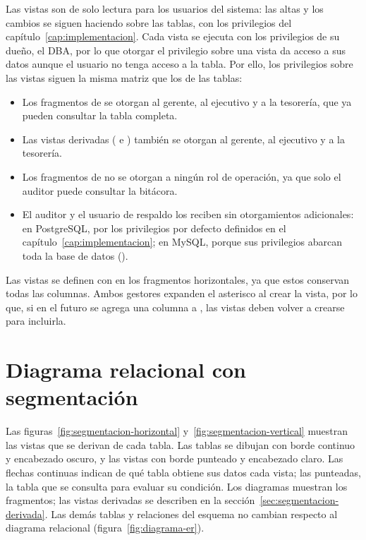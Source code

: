 Las vistas son de solo lectura para los usuarios del sistema: las altas y los cambios se siguen haciendo sobre las tablas, con los privilegios del capítulo~\ref{cap:implementacion}. Cada vista se ejecuta con los privilegios de su dueño, el DBA, por lo que otorgar el privilegio  sobre una vista da acceso a sus datos aunque el usuario no tenga acceso a la tabla. Por ello, los privilegios sobre las vistas siguen la misma matriz que los de las tablas:

\begin{itemize}[leftmargin=*]
	\item Los fragmentos de  se otorgan al gerente, al ejecutivo y a la tesorería, que ya pueden consultar la tabla completa.
	\item Las vistas derivadas ( e ) tambi\'en se otorgan al gerente, al ejecutivo y a la tesorer\'ia.
	\item Los fragmentos de  no se otorgan a ningún rol de operación, ya que solo el auditor puede consultar la bitácora.
	\item El auditor y el usuario de respaldo los reciben sin otorgamientos adicionales: en PostgreSQL, por los privilegios por defecto definidos en el capítulo~\ref{cap:implementacion}; en MySQL, porque sus privilegios abarcan toda la base de datos ().
\end{itemize}

Las vistas se definen con  en los fragmentos horizontales, ya que estos conservan todas las columnas. Ambos gestores expanden el asterisco al crear la vista, por lo que, si en el futuro se agrega una columna a , las vistas deben volver a crearse para incluirla.

\section{Diagrama relacional con segmentaci\'on}

Las figuras~\ref{fig:segmentacion-horizontal} y~\ref{fig:segmentacion-vertical} muestran las vistas que se derivan de cada tabla. Las tablas se dibujan con borde continuo y encabezado oscuro, y las vistas con borde punteado y encabezado claro. Las flechas continuas indican de qué tabla obtiene sus datos cada vista; las punteadas, la tabla que se consulta para evaluar su condición. Los diagramas muestran los fragmentos; las vistas derivadas se describen en la secci\'on~\ref{sec:segmentacion-derivada}. Las demás tablas y relaciones del esquema no cambian respecto al diagrama relacional (figura~\ref{fig:diagrama-er}).

